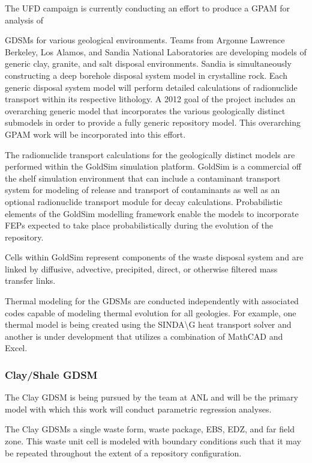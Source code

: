 The \gls{UFD} campaign is currently conducting an effort to produce
a \acrlong{GPAM} for analysis of {\glspl{GDSM} for various geological environments. Teams from Argonne
Lawrence Berkeley, Los Alamos, and Sandia National Laboratories are developing
models of generic clay, granite, and salt disposal environments. Sandia is
simultaneously constructing a deep borehole disposal system model in crystalline 
rock. Each generic disposal system model will perform detailed calculations of 
radionuclide transport within its respective lithology. A 2012 goal of the 
project includes an overarching generic model that incorporates the various 
geologically distinct submodels in order to provide a fully generic repository 
model. This overarching \gls{GPAM} work will be incorporated into this effort.

The radionuclide transport calculations for the geologically distinct models 
are performed within the GoldSim simulation platform. GoldSim is a commercial
off the shelf simulation environment that can include a contaminant transport 
system for modeling of release and transport of contaminants as well as an 
optional radionuclide transport module for decay calculations. 
Probabilistic elements of the GoldSim modelling framework enable the models to 
incorporate \gls{FEPs} expected to take place probabilistically during the 
evolution of the repository.  

Cells within GoldSim represent components of the waste disposal system and
are linked by diffusive, advective, precipited, direct, or  otherwise filtered
mass transfer links. 

Thermal modeling for the \glspl{GDSM} are conducted independently with 
associated codes capable of modeling thermal evolution for all geologies. For 
example, one thermal model is being created using the SINDA\textbackslash G heat
transport solver and another is under development that utilizes a combination 
of MathCAD and Excel. 

\subsubsection{Clay/Shale GDSM}

The Clay \gls{GDSM} is being pursued by the team at \gls{ANL} and will be 
the primary model with which this work will conduct parametric regression 
analyses. 

The Clay \glspl{GDSM} a single waste form, waste package, \gls{EBS}, 
\gls{EDZ}, and far field zone. This waste unit cell is modeled with boundary 
conditions such that it may be repeated throughout the extent of a repository 
configuration. 

}
